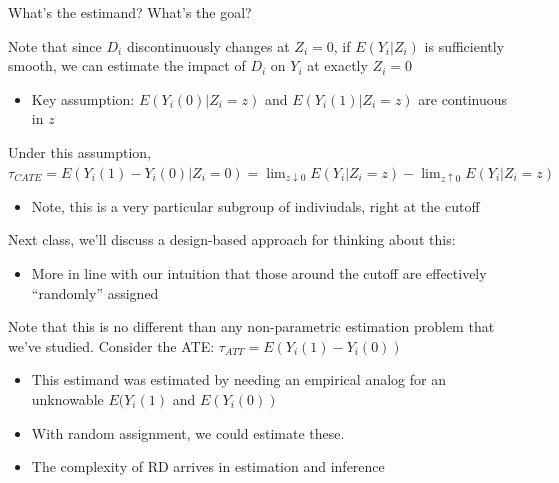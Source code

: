 \documentclass[notes,11pt, aspectratio=169]{beamer}
\newenvironment{wideitemize}{\itemize\addtolength{\itemsep}{10pt}}{\enditemize}
\begin{document}
\begin{frame}{What's the estimand? What's the goal?}
  \begin{wideitemize}
  \item Note that since $D_{i}$ discontinuously changes at
    $Z_{i} = 0$, if $E(Y_{i}|Z_{i})$ is sufficiently smooth, we can
    estimate the impact of $D_{i}$ on $Y_{i}$ at exactly $Z_{i} = 0$
    \begin{itemize}
    \item Key assumption: $E(Y_{i}(0) | Z_{i} = z)$ and
      $E(Y_{i}(1) | Z_{i} = z)$ are continuous in $z$
    \end{itemize}
  \item Under this assumption,  $\tau_{CATE} = E(Y_{i}(1) - Y_{i}(0) | Z_{i} = 0) = \lim_{z \downarrow 0}E(Y_{i} | Z_{i}= z) - \lim_{z \uparrow 0}E(Y_{i} | Z_{i}= z)$
    \begin{itemize}
    \item Note, this is a very particular subgroup of indiviudals, right at the cutoff
    \end{itemize}
  \item Next class, we'll discuss a design-based approach for thinking about this:
    \begin{itemize}
    \item More in line with our intuition that those around the cutoff
      are effectively ``randomly'' assigned
    \end{itemize}
  \item Note that this is no different than any non-parametric
    estimation problem that we've studied. Consider the ATE: $\tau_{ATT} = E(Y_{i}(1) - Y_{i}(0))$
    \begin{itemize}
    \item This estimand was estimated by needing an empirical analog
      for an unknowable $E(Y_{i}(1)$ and $E(Y_{i}(0))$
    \item With random assignment, we could estimate these.
    \item The complexity of RD arrives in estimation and inference
    \end{itemize}
  \end{wideitemize}
\end{frame}
\end{document}
